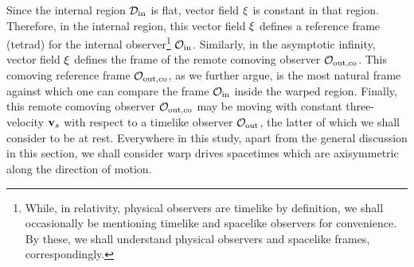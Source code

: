 \documentclass[10pt]{iopart}
\begin{document}
Since the internal region $\mathcal{D}_{\rm in}$ is flat, vector field ${\bf \xi}$ is constant in that region. Therefore, in the internal region, this vector field ${\bf \xi}$ defines a reference frame (tetrad) for the internal observer\footnote{While, in relativity, physical observers are timelike by definition, we shall occasionally be mentioning timelike and spacelike observers for convenience. By these, we shall understand physical observers and spacelike frames, correspondingly.}  $\mathcal{O}_{\rm in}$. Similarly, in the asymptotic infinity, vector field ${\bf \xi}$ defines the frame of the remote comoving observer $\mathcal{O}_{\rm out, co}$. This comoving reference frame $\mathcal{O}_{\rm out, co}$, as we further argue, is the most natural frame against which one can compare the frame $\mathcal{O}_{\rm in}$ inside the warped region. Finally, this remote comoving observer $\mathcal{O}_{\rm out, co}$ may be moving with constant three-velocity ${\bf v}_s$ with respect to a timelike observer $\mathcal{O}_{\rm out}$, the latter of which we shall consider to be at rest. Everywhere in this study, apart from the general discussion in this section, we shall consider warp drives spacetimes which are axisymmetric along the direction of motion.
\end{document}
